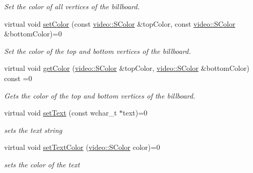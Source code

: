\begin{DoxyCompactItemize}
\begin{DoxyCompactList}\small\item\em Set the color of all vertices of the billboard. \end{DoxyCompactList}\item 
virtual void \hyperlink{classirr_1_1scene_1_1IBillboardTextSceneNode_ab3faa7c4238acd6bc3a2330cb5650da5}{set\+Color} (const \hyperlink{classirr_1_1video_1_1SColor}{video\+::\+S\+Color} \&top\+Color, const \hyperlink{classirr_1_1video_1_1SColor}{video\+::\+S\+Color} \&bottom\+Color)=0
\begin{DoxyCompactList}\small\item\em Set the color of the top and bottom vertices of the billboard. \end{DoxyCompactList}\item 
virtual void \hyperlink{classirr_1_1scene_1_1IBillboardTextSceneNode_ac142a04e455811d5a3efa47ce2499d18}{get\+Color} (\hyperlink{classirr_1_1video_1_1SColor}{video\+::\+S\+Color} \&top\+Color, \hyperlink{classirr_1_1video_1_1SColor}{video\+::\+S\+Color} \&bottom\+Color) const =0
\begin{DoxyCompactList}\small\item\em Gets the color of the top and bottom vertices of the billboard. \end{DoxyCompactList}\item 
\mbox{\label{classirr_1_1scene_1_1IBillboardTextSceneNode_ab404347cd57f64bb559cca8bed8caa53}} 
virtual void \hyperlink{classirr_1_1scene_1_1IBillboardTextSceneNode_ab404347cd57f64bb559cca8bed8caa53}{set\+Text} (const wchar\+\_\+t $\ast$text)=0
\begin{DoxyCompactList}\small\item\em sets the text string \end{DoxyCompactList}\item 
\mbox{\label{classirr_1_1scene_1_1IBillboardTextSceneNode_a05e1db5ef9af3ff0ab2750ba584583ef}} 
virtual void \hyperlink{classirr_1_1scene_1_1IBillboardTextSceneNode_a05e1db5ef9af3ff0ab2750ba584583ef}{set\+Text\+Color} (\hyperlink{classirr_1_1video_1_1SColor}{video\+::\+S\+Color} color)=0
\begin{DoxyCompactList}\small\item\em sets the color of the text \end{DoxyCompactList}\end{DoxyCompactItemize}
